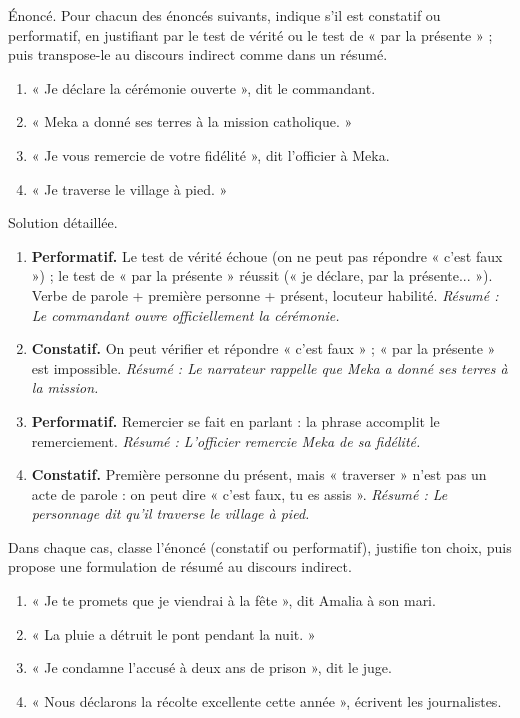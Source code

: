 \documentclass[11pt]{article}
\begin{document}
\begin{exoresolu}
Énoncé. Pour chacun des énoncés suivants, indique s'il est constatif ou performatif, en justifiant par le test de vérité ou le test de « par la présente » ; puis transpose-le au discours indirect comme dans un résumé.
\begin{enumerate}
\item « Je déclare la cérémonie ouverte », dit le commandant.
\item « Meka a donné ses terres à la mission catholique. »
\item « Je vous remercie de votre fidélité », dit l'officier à Meka.
\item « Je traverse le village à pied. »
\end{enumerate}
\tcblower
Solution détaillée.
\begin{enumerate}
\item \textbf{Performatif.} Le test de vérité échoue (on ne peut pas répondre « c'est faux ») ; le test de « par la présente » réussit (« je déclare, par la présente... »). Verbe de parole + première personne + présent, locuteur habilité. \emph{Résumé : Le commandant ouvre officiellement la cérémonie.}
\item \textbf{Constatif.} On peut vérifier et répondre « c'est faux » ; « par la présente » est impossible. \emph{Résumé : Le narrateur rappelle que Meka a donné ses terres à la mission.}
\item \textbf{Performatif.} Remercier se fait en parlant : la phrase accomplit le remerciement. \emph{Résumé : L'officier remercie Meka de sa fidélité.}
\item \textbf{Constatif.} Première personne du présent, mais « traverser » n'est pas un acte de parole : on peut dire « c'est faux, tu es assis ». \emph{Résumé : Le personnage dit qu'il traverse le village à pied.}
\end{enumerate}
\end{exoresolu}

\begin{exercice}
Dans chaque cas, classe l'énoncé (constatif ou performatif), justifie ton choix, puis propose une formulation de résumé au discours indirect.
\begin{enumerate}
\item « Je te promets que je viendrai à la fête », dit Amalia à son mari.
\item « La pluie a détruit le pont pendant la nuit. »
\item « Je condamne l'accusé à deux ans de prison », dit le juge.
\item « Nous déclarons la récolte excellente cette année », écrivent les journalistes.
\end{enumerate}
\end{exercice}
\end{document}

